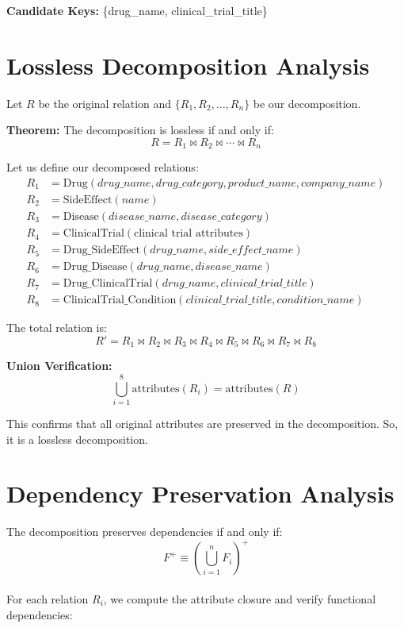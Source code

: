 \documentclass[12pt,a4paper]{article}
\begin{document}
\textbf{Candidate Keys:} \{drug\_name, clinical\_trial\_title\}

\section{Lossless Decomposition Analysis}

Let $R$ be the original relation and $\{R_1, R_2, \ldots, R_n\}$ be our decomposition.

\textbf{Theorem:} The decomposition is lossless if and only if:
$$R = R_1 \bowtie R_2 \bowtie \cdots \bowtie R_n$$

Let us define our decomposed relations:
\begin{align}
R_1 &= \text{Drug}(drug\_name, drug\_category, product\_name, company\_name) \\
R_2 &= \text{SideEffect}(name) \\
R_3 &= \text{Disease}(disease\_name, disease\_category) \\
R_4 &= \text{ClinicalTrial}(\text{clinical trial attributes}) \\
R_5 &= \text{Drug\_SideEffect}(drug\_name, side\_effect\_name) \\
R_6 &= \text{Drug\_Disease}(drug\_name, disease\_name) \\
R_7 &= \text{Drug\_ClinicalTrial}(drug\_name, clinical\_trial\_title) \\
R_8 &= \text{ClinicalTrial\_Condition}(clinical\_trial\_title, condition\_name)
\end{align}

The total relation is:
$$R' = R_1 \bowtie R_2 \bowtie R_3 \bowtie R_4 \bowtie R_5 \bowtie R_6 \bowtie R_7 \bowtie R_8$$


\textbf{Union Verification:}
$$\bigcup_{i=1}^{8} \text{attributes}(R_i) = \text{attributes}(R)$$

This confirms that all original attributes are preserved in the decomposition. So, it is a lossless decomposition.

\section{Dependency Preservation Analysis}

The decomposition preserves dependencies if and only if:
$$F^+ \equiv \left(\bigcup_{i=1}^{n} F_i\right)^+$$\\


For each relation $R_i$, we compute the attribute closure and verify functional dependencies:
\end{document}
